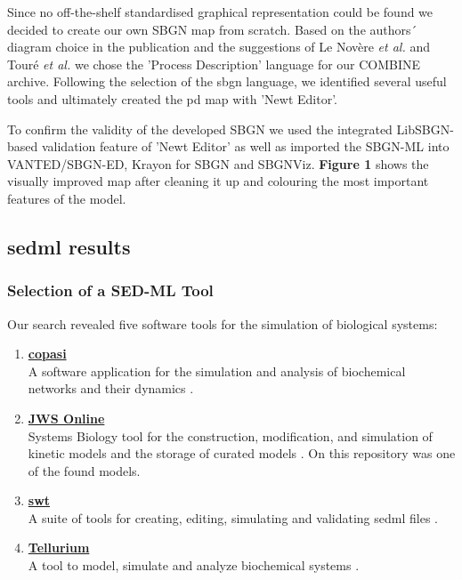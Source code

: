 Since no off-the-shelf standardised graphical representation could be found we decided to create our own SBGN map from scratch. Based on the authors´ diagram choice in the publication and the suggestions of Le Novère \textit{et al.} \cite{sbgnnovere} and Touré \textit{et al.} \cite{sbgntoure} we chose the 'Process Description' language for our COMBINE archive. Following the selection of the \ac{sbgn} language, we identified several useful tools and ultimately created the \ac{pd} map with 'Newt Editor'. 

To confirm the validity of the developed SBGN we used the integrated LibSBGN-based validation feature of 'Newt Editor' as well as imported the SBGN-ML into VANTED/SBGN-ED, Krayon for SBGN and SBGNViz. \textbf{Figure 1} shows the visually improved map after cleaning it up and colouring the most important features of the model.

\subsection*{\acf{sedml} results}

\subsubsection*{Selection of a SED-ML Tool}

Our search revealed five software tools for the simulation of biological systems:
\begin{enumerate} 
    \item \hyperlink{http://copasi.org/}{\textbf{\ac{copasi}}}\\A software application for the simulation and analysis of biochemical networks and their dynamics \cite{copasi}.
   
    \item \hyperlink{https://www.systemsmedicine.net/posts/jws-online-biological-systems-modelling}{\textbf{JWS Online}}\\ Systems Biology tool for the construction, modification, and simulation of kinetic models and the storage of curated models \cite{jwsonline}. On this repository was one of the found models.
   
    \item \hyperlink{https://sed-ml.org/}{\textbf{\ac{swt}}}\\A suite of tools for creating, editing, simulating and validating \ac{sedml} files \cite{sedml}. 
   
    \item \hyperlink{https://tellurium.readthedocs.io/en/latest/}{\textbf{Tellurium}}\\ A tool to model, simulate and analyze biochemical systems \cite{tellurium}.
    
\end{enumerate}

